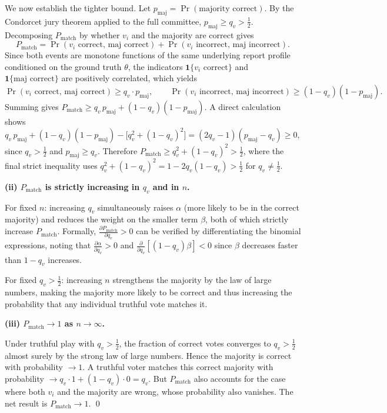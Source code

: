 We now establish the tighter bound. Let $p_{\text{maj}} = \Pr(\text{majority correct})$. By the Condorcet jury theorem applied to the full committee, $p_{\text{maj}} \geq q_v > \tfrac{1}{2}$. Decomposing $P_{\text{match}}$ by whether $v_i$ and the majority are correct gives
\[
P_{\text{match}} = \Pr(v_i \text{ correct}, \, \text{maj correct}) + \Pr(v_i \text{ incorrect}, \, \text{maj incorrect}).
\]
Since both events are monotone functions of the same underlying report profile conditioned on the ground truth $\theta$, the indicators $\mathbf{1}\{v_i \text{ correct}\}$ and $\mathbf{1}\{\text{maj correct}\}$ are positively correlated, which yields
\[
\Pr(v_i \text{ correct}, \, \text{maj correct}) \geq q_v \cdot p_{\text{maj}}, \qquad \Pr(v_i \text{ incorrect}, \, \text{maj incorrect}) \geq (1-q_v)(1-p_{\text{maj}}).
\]
Summing gives $P_{\text{match}} \geq q_v\,p_{\text{maj}} + (1-q_v)(1-p_{\text{maj}})$. A direct calculation shows
\[
q_v\,p_{\text{maj}} + (1-q_v)(1-p_{\text{maj}}) - \bigl[q_v^2 + (1-q_v)^2\bigr] = (2q_v - 1)(p_{\text{maj}} - q_v) \geq 0,
\]
since $q_v > \tfrac{1}{2}$ and $p_{\text{maj}} \geq q_v$. Therefore $P_{\text{match}} \geq q_v^2 + (1-q_v)^2 > \tfrac{1}{2}$, where the final strict inequality uses $q_v^2 + (1-q_v)^2 = 1 - 2q_v(1-q_v) > \tfrac{1}{2}$ for $q_v \neq \tfrac{1}{2}$.

\textbf{(ii) $P_{\text{match}}$ is strictly increasing in $q_v$ and in $n$.}

For fixed $n$: increasing $q_v$ simultaneously raises $\alpha$ (more likely to be in the correct majority) and reduces the weight on the smaller term $\beta$, both of which strictly increase $P_{\text{match}}$. Formally, $\frac{\partial P_{\text{match}}}{\partial q_v} > 0$ can be verified by differentiating the binomial expressions, noting that $\frac{\partial \alpha}{\partial q_v} > 0$ and $\frac{\partial}{\partial q_v}[(1-q_v)\beta] < 0$ since $\beta$ decreases faster than $1-q_v$ increases.

For fixed $q_v > \frac{1}{2}$: increasing $n$ strengthens the majority by the law of large numbers, making the majority more likely to be correct and thus increasing the probability that any individual truthful vote matches it.

\textbf{(iii) $P_{\text{match}} \to 1$ as $n \to \infty$.}

Under truthful play with $q_v > \frac{1}{2}$, the fraction of correct votes converges to $q_v > \frac{1}{2}$ almost surely by the strong law of large numbers. Hence the majority is correct with probability $\to 1$. A truthful voter matches this correct majority with probability $\to q_v \cdot 1 + (1-q_v) \cdot 0 = q_v$. But $P_{\text{match}}$ also accounts for the case where both $v_i$ and the majority are wrong, whose probability also vanishes. The net result is $P_{\text{match}} \to 1$. \qed


